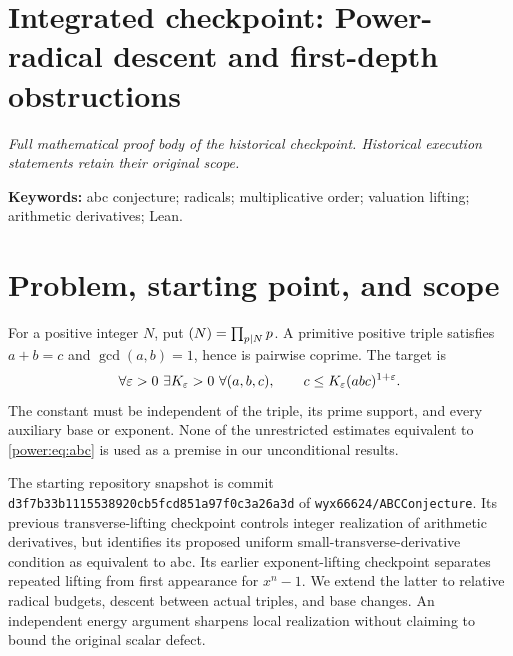 \clearpage
\begingroup
\let\rad\relax
\newcommand{\rad}{\operatorname{rad}}
\let\ord\relax
\newcommand{\ord}{\operatorname{ord}}
\let\lcm\relax
\newcommand{\lcm}{\operatorname{lcm}}
\let\Z\relax
\newcommand{\Z}{\mathbb Z}
\let\N\relax
\newcommand{\N}{\mathbb N}
\let\R\relax
\newcommand{\R}{\mathbb R}
\let\vp\relax
\newcommand{\vp}{v_p}
\let\Qm\relax
\newcommand{\Qm}{\mathcal Q_m}
\section*{Integrated checkpoint: Power-radical descent and first-depth obstructions}
\label{checkpoint:power}
\noindent\textit{Full mathematical proof body of the historical checkpoint. Historical execution statements retain their original scope.}\medskip



\noindent\textbf{Keywords:} abc conjecture; radicals; multiplicative order; valuation lifting; arithmetic derivatives; Lean.

\section{Problem, starting point, and scope}
For a positive integer $N$, put $\rad(N)=\prod_{p\mid N}p$. A primitive
positive triple satisfies $a+b=c$ and $\gcd(a,b)=1$, hence is pairwise coprime.
The target is
\begin{equation}\label{power:eq:abc}
\forall\varepsilon>0\ \exists K_\varepsilon>0\ \forall(a,b,c),\qquad
c\le K_\varepsilon\rad(abc)^{1+\varepsilon}.
\end{equation}
The constant must be independent of the triple, its prime support, and every
auxiliary base or exponent. None of the unrestricted estimates equivalent to
\eqref{power:eq:abc} is used as a premise in our unconditional results.

The starting repository snapshot is commit
\texttt{d3f7b33b1115538920cb5fcd851a97f0c3a26a3d} of
\texttt{wyx66624/ABCConjecture}. Its previous transverse-lifting checkpoint
\cite{power:transverse} controls integer realization of arithmetic derivatives,
but identifies its proposed uniform small-transverse-derivative condition
as equivalent to abc. Its earlier exponent-lifting checkpoint
\cite{power:multiflag} separates repeated lifting from first appearance for
$x^n-1$. We extend the latter to relative radical budgets, descent between
actual triples, and base changes. An independent energy argument sharpens
local realization without claiming to bound the original scalar defect.

